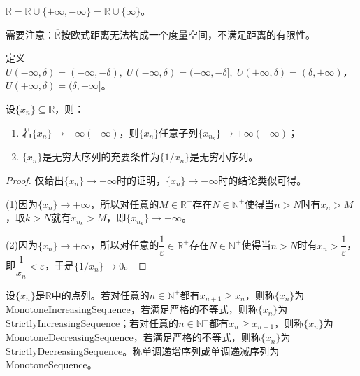 \begin{definition}
	$\overline{\mathbb{R}}=\mathbb{R}\cup\{+\infty,-\infty\}=\mathbb{R}\cup\{\infty\}$。
\end{definition}
\begin{note}
	需要注意：$\overline{\mathbb{R}}$按欧式距离无法构成一个度量空间，不满足距离的有限性。
\end{note}
\begin{definition}
	定义$U(-\infty,\delta)=(-\infty,-\delta),\;\bar{U}(-\infty,\delta)=(-\infty,-\delta],\;U(+\infty,\delta)=(\delta,+\infty)$，$\bar{U}(+\infty,\delta)=(\delta,+\infty]$。
\end{definition}
\begin{property}
	设$\{x_n\}\subseteq\mathbb{R}$，则：
	\begin{enumerate}
		\item 若$\{x_n\}\to+\infty(-\infty)$，则$\{x_n\}$任意子列$\{x_{n_k}\}\to+\infty(-\infty)$；
		\item $\{x_n\}$是无穷大序列的充要条件为$\{1/x_n\}$是无穷小序列。
	\end{enumerate}
\end{property}
\begin{proof}
	仅给出$\{x_n\}\to+\infty$时的证明，$\{x_n\}\to-\infty$时的结论类似可得。\par
	(1)因为$\{x_n\}\to+\infty$，所以对任意的$M\in\mathbb{R}^{+}$存在$N\in\mathbb{N}^+$使得当$n>N$时有$x_n>M$，取$k>N$就有$x_{n_k}>M$，即$\{x_{n_k}\}\to+\infty$。\par
	(2)因为$\{x_n\}\to+\infty$，所以对任意的$\dfrac{1}{\varepsilon}\in\mathbb{R}^{+}$存在$N\in\mathbb{N}^+$使得当$n>N$时有$x_n>\dfrac{1}{\varepsilon}$，即$\dfrac{1}{x_n}<\varepsilon$，于是$\{1/x_n\}\to0$。
\end{proof}
\begin{definition}
	设$\{x_n\}$是$\mathbb{R}$中的点列。若对任意的$n\in\mathbb{N}^+$都有$x_{n+1}\geqslant x_n$，则称$\{x_n\}$为\gls{MonotoneIncreasingSequence}，若满足严格的不等式，则称$\{x_n\}$为\gls{StrictlyIncreasingSequence}；若对任意的$n\in\mathbb{N}^+$都有$x_n\geqslant x_{n+1}$，则称$\{x_n\}$为\gls{MonotoneDecreasingSequence}，若满足严格的不等式，则称$\{x_n\}$为\gls{StrictlyDecreasingSequence}。称单调递增序列或单调递减序列为\gls{MonotoneSequence}。
\end{definition}
